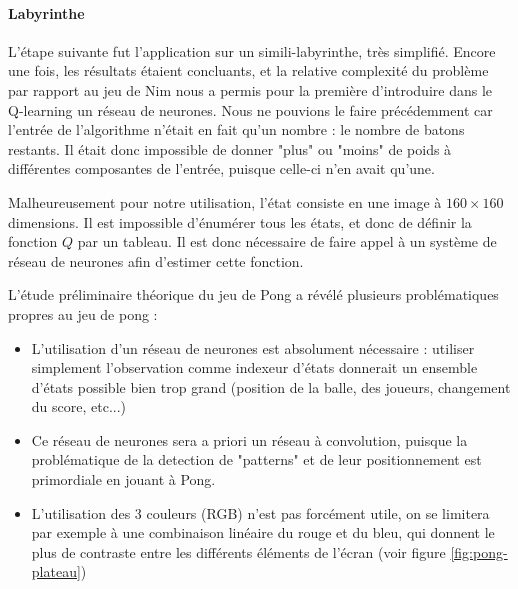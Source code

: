 \documentclass[
    10pt,
    a4paper,
    oneside,
    headinclude,footinclude,
    BCOR=5mm,
    captions=tableabove
]{scrartcl}
\begin{document}
\paragraph{Labyrinthe}
L'étape suivante fut l'application sur un simili-labyrinthe, très simplifié. Encore une fois, les résultats étaient concluants, et la relative complexité du problème par rapport au jeu de Nim nous a permis pour la première d'introduire dans le Q-learning un réseau de neurones. Nous ne pouvions le faire précédemment car l'entrée de l'algorithme n'était en fait qu'un nombre : le nombre de batons restants. Il était donc impossible de donner "plus" ou "moins" de poids à différentes composantes de l'entrée, puisque celle-ci n'en avait qu'une.

Malheureusement pour notre utilisation, l'état consiste en une image à $160 \times 160$ dimensions. Il est impossible d'énumérer tous les états, et donc de définir la fonction $Q$ par un tableau. Il est donc nécessaire de faire appel à un système de réseau de neurones afin d'estimer cette fonction.

L'étude préliminaire théorique du jeu de Pong a révélé plusieurs problématiques propres au jeu de pong :
\begin{itemize}
	\item L'utilisation d'un réseau de neurones est absolument nécessaire : utiliser simplement l'observation comme indexeur d'états donnerait un ensemble d'états possible bien trop grand (position de la balle, des joueurs, changement du score, etc...)
	\item Ce réseau de neurones sera a priori un réseau à convolution, puisque la problématique de la detection de "patterns" et de leur positionnement est primordiale en jouant à Pong.
	\item L'utilisation des 3 couleurs (RGB) n'est pas forcément utile, on se limitera par exemple à une combinaison linéaire du rouge et du bleu, qui donnent le plus de contraste entre les différents éléments de l'écran (voir figure \ref{fig:pong-plateau})
\end{itemize}
\end{document}
